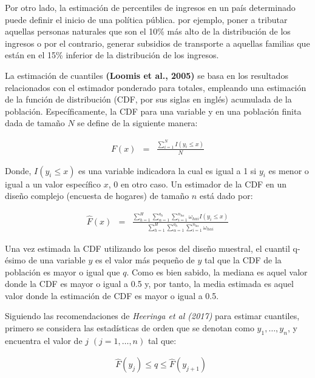 \documentclass[
  spanish,
  12pt,
]{book}
\begin{document}
Por otro lado, la estimación de percentiles de ingresos en un país determinado puede definir el inicio de una política pública. por ejemplo, poner a tributar aquellas personas naturales que son el 10\% más alto de la distribución de los ingresos o por el contrario, generar subsidios de transporte a aquellas familias que están en el 15\% inferior de la distribución de los ingresos.

La estimación de cuantiles \textbf{(Loomis et al., 2005)} se basa en los resultados relacionados con el estimador ponderado para totales, empleando una estimación de la función de distribución (CDF, por sus siglas en inglés) acumulada de la población. Específicamente, la CDF para una variable y en una población finita dada de tamaño \(N\) se define de la siguiente manera:

\begin{eqnarray*}
F\left(x\right) & = & \frac{{ \sum_{i=1}^{N}}I\left(y_{i}\leq x\right)}{N}
\end{eqnarray*}

Donde, \(I\left(y_{i}\leq x\right)\) es una variable indicadora la
cual es igual a 1 si \(y_{i}\) es menor o igual a un valor específico
\(x\), 0 en otro caso. Un estimador de la CDF en un diseño complejo
(encuesta de hogares) de tamaño \(n\) está dado por:

\begin{eqnarray*}
\hat{F}\left(x\right) & = & \frac{\sum_{h=1}^{H}\sum_{\alpha=1}^{a_{h}}\sum_{i=1}^{n_{h\alpha}}\omega_{h\alpha i}I\left(y_{i}\leq x\right)}{\sum_{h=1}^{H}\sum_{\alpha=1}^{a_{h}}\sum_{i=1}^{n_{h\alpha}}\omega_{h\alpha i}}
\end{eqnarray*}

Una vez estimada la CDF utilizando los pesos del diseño muestral, el cuantil q-ésimo de una variable \(y\) es el valor más pequeño de \(y\) tal que la CDF de la población es mayor o igual que \(q\). Como es bien sabido, la mediana es aquel valor donde la CDF es mayor o igual a 0.5 y, por tanto, la media estimada es aquel valor donde la estimación de CDF es mayor o igual a 0.5.

Siguiendo las recomendaciones de \emph{Heeringa et al (2017)} para estimar cuantiles, primero se considera las estadísticas de orden que se denotan como \(y_{1},\ldots,y_{n}\), y encuentra el valor de \(j\) \((j=1,\ldots,n)\) tal que:

\begin{eqnarray*}
 & \hat{F}\left(y_{j}\right)\leq q\leq\hat{F}\left(y_{j+1}\right)
\end{eqnarray*}
\end{document}

